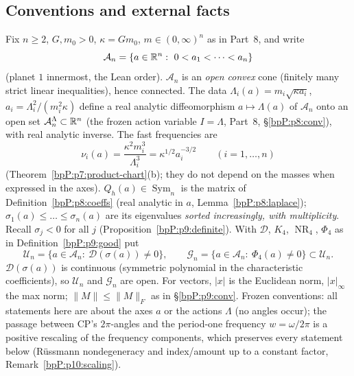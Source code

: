 \subsection{Conventions and external facts}\label{bpP:p10:conv}

Fix $n\ge2$, $G,m_0>0$, $\kappa=Gm_0$, $m\in(0,\infty)^n$ as in Part~8, and write
\[\mathcal A_n=\{a\in\mathbb{R}^n:\ 0<a_1<\dots<a_n\}\]
(planet $1$ innermost, the Lean order). $\mathcal A_n$ is an \emph{open convex} cone (finitely many strict linear inequalities), hence connected. The data $\Lambda_i(a)=m_i\sqrt{\kappa a_i}$, $a_i=\Lambda_i^2/(m_i^2\kappa)$ define a real analytic diffeomorphism $a\mapsto\Lambda(a)$ of $\mathcal A_n$ onto an open set $\mathcal A_n^\Lambda\subset\mathbb{R}^n$ (the frozen action variable $I=\Lambda$, Part~8, \S\ref{bpP:p8:conv}), with real analytic inverse. The fast frequencies are
\[\nu_i(a)=\frac{\kappa^2m_i^3}{\Lambda_i^3}=\kappa^{1/2}a_i^{-3/2}\qquad(i=1,\dots,n)\]
(Theorem~\ref{bpP:p7:product-chart}(b); they do not depend on the masses when expressed in the axes). $Q_h(a)\in\operatorname{Sym}_n$ is the matrix of Definition~\ref{bpP:p8:coeffs} (real analytic in $a$, Lemma~\ref{bpP:p8:laplace}); $\sigma_1(a)\le\dots\le\sigma_n(a)$ are its eigenvalues \emph{sorted increasingly, with multiplicity}. Recall $\sigma_j<0$ for all $j$ (Proposition~\ref{bpP:p9:definite}). With $\mathcal D$, $K_4$, $\operatorname{NR}_4$, $\Phi_4$ as in Definition~\ref{bpP:p9:good} put
\[\mathcal U_n=\{a\in\mathcal A_n:\ \mathcal D(\sigma(a))\ne0\},\qquad\mathcal G_n=\{a\in\mathcal A_n:\ \Phi_4(a)\ne0\}\subset\mathcal U_n .\]
$\mathcal D(\sigma(a))$ is continuous (symmetric polynomial in the characteristic coefficients), so $\mathcal U_n$ and $\mathcal G_n$ are open. For vectors, $\lvert x\rvert$ is the Euclidean norm, $\lvert x\rvert_\infty$ the max norm; $\lVert M\rVert\le\lVert M\rVert_F$ as in \S\ref{bpP:p9:conv}. Frozen conventions: all statements here are about the axes $a$ or the actions $\Lambda$ (no angles occur); the passage between CP's $2\pi$-angles and the period-one frequency $w=\omega/2\pi$ is a positive rescaling of the frequency components, which preserves every statement below (R\"ussmann nondegeneracy and index/amount up to a constant factor, Remark~\ref{bpP:p10:scaling}).

